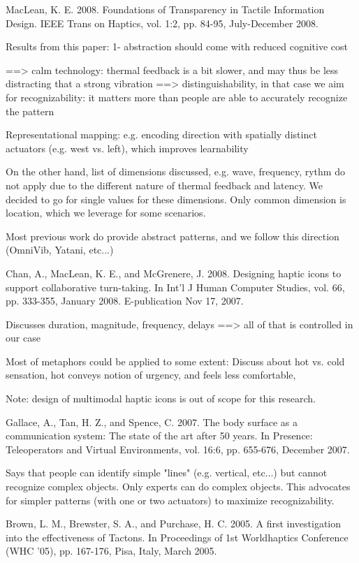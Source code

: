 MacLean, K. E. 2008. Foundations of Transparency in Tactile Information Design. IEEE Trans on Haptics, vol. 1:2, pp. 84-95, July-December 2008.

Results from this paper:
1- abstraction should come with reduced cognitive cost

==> calm technology: thermal feedback is a bit slower, and may thus be less distracting that a strong vibration
==> distinguishability, in that case we aim for recognizability: it matters more than people are able to accurately recognize the pattern

Representational mapping: e.g. encoding direction with spatially distinct actuators (e.g. west vs. left), which improves learnability

On the other hand, list of dimensions discussed, e.g. wave, frequency, rythm do not apply due to the different nature of thermal feedback and latency. We decided to go for single values for these dimensions.
Only common dimension is location, which we leverage for some scenarios.

Most previous work do provide abstract patterns, and we follow this direction (OmniVib, Yatani, etc...)

Chan, A., MacLean, K. E., and McGrenere, J. 2008. Designing haptic icons to support collaborative turn-taking. In Int'l J Human Computer Studies, vol. 66, pp. 333-355, January 2008. E-publication Nov 17, 2007.

Discusses duration, magnitude, frequency, delays
==> all of that is controlled in our case

Most of metaphors could be applied to some extent:
Discuss about hot vs. cold sensation, hot conveys notion of urgency, and feels less comfortable,

Note: design of multimodal haptic icons is out of scope for this research.



Gallace, A., Tan, H. Z., and Spence, C. 2007. The body surface as a communication system: The state of the art after 50 years. In Presence: Teleoperators and Virtual Environments, vol. 16:6, pp. 655-676, December 2007.

Says that people can identify simple "lines" (e.g. vertical, etc...) but cannot recognize complex objects. Only experts can do complex objects. This advocates for simpler patterns (with one or two actuators) to maximize recognizability.

Brown, L. M., Brewster, S. A., and Purchase, H. C. 2005. A first investigation into the effectiveness of Tactons. In Proceedings of 1st Worldhaptics Conference (WHC '05), pp. 167-176, Pisa, Italy, March 2005.

